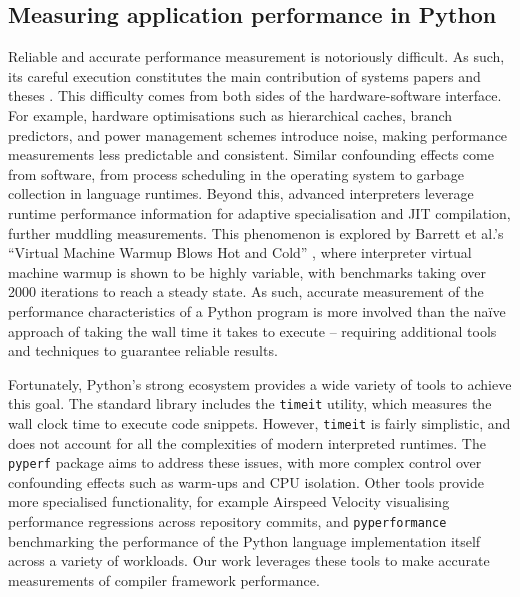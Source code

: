 \subsection{Measuring application performance in Python}
\label{sec:python-performance-application}

Reliable and accurate performance measurement is notoriously difficult.
As such, its careful execution constitutes the main contribution of systems papers and theses \cite{crapeperformance} \cite{harris2021understanding}.
This difficulty comes from both sides of the hardware-software interface.
For example, hardware optimisations such as hierarchical caches, branch predictors, and power management schemes introduce noise, making performance measurements less predictable and consistent. Similar confounding effects come from software, from process scheduling in the operating system to garbage collection in language runtimes.
Beyond this, advanced interpreters leverage runtime performance information for adaptive specialisation and JIT compilation, further muddling measurements. This phenomenon is explored by Barrett et al.'s ``Virtual Machine Warmup Blows Hot and Cold'' \cite{barrettVirtualMachineWarmup2017}, where interpreter virtual machine warmup is shown to be highly variable, with benchmarks taking over 2000 iterations to reach a steady state.
As such, accurate measurement of the performance characteristics of a Python program is more involved than the na\"ive approach of taking the wall time it takes to execute -- requiring additional tools and techniques to guarantee reliable results.

Fortunately, Python's strong ecosystem provides a wide variety of tools to achieve this goal.
The standard library includes the \texttt{timeit} utility, which measures the wall clock time to execute code snippets. However, \texttt{timeit} is fairly simplistic, and does not account for all the complexities of modern interpreted runtimes.
The \texttt{pyperf} \cite{victorstinnerPsfPyperf2025} package aims to address these issues, with more complex control over confounding effects such as warm-ups and CPU isolation.
Other tools provide more specialised functionality, for example Airspeed Velocity \cite{michaeldroettboomAirspeedvelocityAsv2025} visualising performance regressions across repository commits, and \texttt{pyperformance} \cite{collinwinterPythonPyperformance2025} benchmarking the performance of the Python language implementation itself across a variety of workloads.
Our work leverages these tools to make accurate measurements of compiler framework performance.


